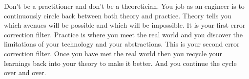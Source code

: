 Don't be a practitioner and don't be a theoretician. You job as an engineer is to continuously circle back between both theory and practice. Theory tells
you which avenues will be possible and which will be impossible. It is your first error correction filter. Practice is where you meet
the real world and you discover the limitations of your technology and your abstractions. This is your second error correction filter. Once
you have met the real world then you recycle your learnings back into your theory to make it better. And you continue the cycle over and over.
